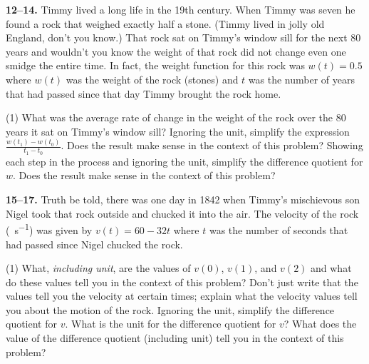 \documentclass[10pt,oneside,]{book}
\theoremstyle{plain}
\theoremstyle{definition}
\numberwithin{equation}{section}
\newcommand{\fe}[2]{#1\mathopen{}\left(#2\right)\mathclose{}}
\begin{document}
\par\smallskip\noindent
\textbf{12--14. }\hypertarget{exercisegroup-6}{\null}Timmy lived a long life in the 19th century. When Timmy was seven he found a rock that weighed exactly half a stone. (Timmy lived in jolly old England, don't you know.) That rock sat on Timmy's window sill for the next 80 years and wouldn't you know the weight of that rock did not change even one smidge the entire time. In fact, the weight function for this rock was \(\fe{w}{t}=0.5\) where \(\fe{w}{t}\) was the weight of the rock (stones) and \(t\) was the number of years that had passed since that day Timmy brought the rock home.%
\par
\begin{exercisegroup}(1)
\exercise[12.]\hypertarget{exercise-20}{\null}What was the average rate of change in the weight of the rock over the 80 years it sat on Timmy's window sill?%
\exercise[13.]\hypertarget{exercise-21}{\null}Ignoring the unit, simplify the expression \(\frac{\fe{w}{t_1}-\fe{w}{t_0}}{t_1-t_0}\). Does the result make sense in the context of this problem?%
\exercise[14.]\hypertarget{exercise-22}{\null}Showing each step in the process and ignoring the unit, simplify the difference quotient for \(w\). Does the result make sense in the context of this problem?%
\end{exercisegroup}
\par\smallskip\noindent
\textbf{15--17. }\hypertarget{exercisegroup-7}{\null}Truth be told, there was one day in 1842 when Timmy's mischievous son Nigel took that rock outside and chucked it into the air. The velocity of the rock (\si{\foot\per\second}) was given by \(\fe{v}{t}=60-32t\) where \(t\) was the number of seconds that had passed since Nigel chucked the rock.%
\par
\begin{exercisegroup}(1)
\exercise[15.]\hypertarget{exercise-23}{\null}What, \emph{including unit}, are the values of \(\fe{v}{0}\), \(\fe{v}{1}\), and \(\fe{v}{2}\) and what do these values tell you in the context of this problem? Don't just write that the values tell you the velocity at certain times; explain what the velocity values tell you about the motion of the rock.%
\exercise[16.]\hypertarget{exercise-24}{\null}Ignoring the unit, simplify the difference quotient for \(v\).%
\exercise[17.]\hypertarget{exercise-25}{\null}What is the unit for the difference quotient for \(v\)? What does the value of the difference quotient (including unit) tell you in the context of this problem?%
\end{exercisegroup}
\end{document}
